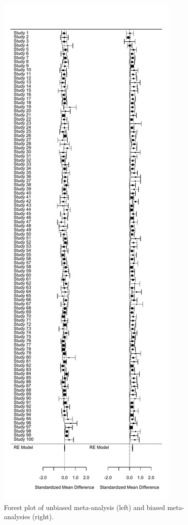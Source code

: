\documentclass[
  oneside]{krantz}
\begin{document}
\begin{figure}

{\centering \includegraphics[width=1\linewidth]{12-bias_files/figure-latex/twoforestplot-1} 

}

\caption{Forest plot of unbiased meta-analysis (left) and biased meta-analysies (right).}\label{fig:twoforestplot}
\end{figure}
\end{document}
